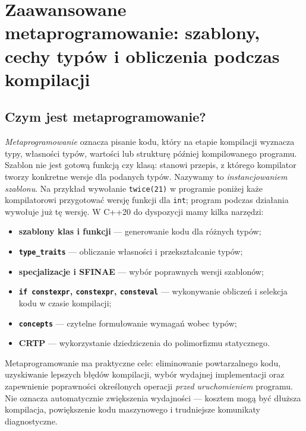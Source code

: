 
\chapter[Metaprogramowanie w C++]{Zaawansowane metaprogramowanie: szablony, cechy typów i obliczenia podczas kompilacji}
\label{chap:meta-cpp}

\section{Czym jest metaprogramowanie?}

\emph{Metaprogramowanie} oznacza pisanie kodu, który na etapie kompilacji
wyznacza typy, własności typów, wartości lub strukturę później
kompilowanego programu. Szablon nie jest gotową funkcją czy klasą:
stanowi przepis, z którego kompilator tworzy konkretne wersje
dla podanych typów. Nazywamy to \emph{instancjowaniem szablonu}.
Na przykład wywołanie
\texttt{twice(21)} w programie poniżej każe kompilatorowi przygotować
wersję funkcji dla \texttt{int}; program podczas działania wywołuje
już tę wersję. W C++20 do dyspozycji mamy kilka narzędzi:
\begin{itemize}
\item \textbf{szablony klas i funkcji} — generowanie kodu dla różnych typów;
\item \textbf{\texttt{type\_traits}} — obliczanie własności i przekształcanie typów;
\item \textbf{specjalizacje i SFINAE} — wybór poprawnych wersji szablonów;
\item \textbf{\texttt{if constexpr}, \texttt{constexpr}, \texttt{consteval}} —
      wykonywanie obliczeń i selekcja kodu w czasie kompilacji;
\item \textbf{\texttt{concepts}} — czytelne formułowanie wymagań wobec typów;
\item \textbf{CRTP} — wykorzystanie dziedziczenia do polimorfizmu statycznego.
\end{itemize}

Metaprogramowanie ma praktyczne cele: eliminowanie powtarzalnego kodu,
uzyskiwanie lepszych błędów kompilacji, wybór wydajnej implementacji oraz
zapewnienie poprawności określonych operacji \emph{przed uruchomieniem} programu.
Nie oznacza automatycznie zwiększenia wydajności — kosztem mogą być dłuższa
kompilacja, powiększenie kodu maszynowego i trudniejsze komunikaty diagnostyczne.

